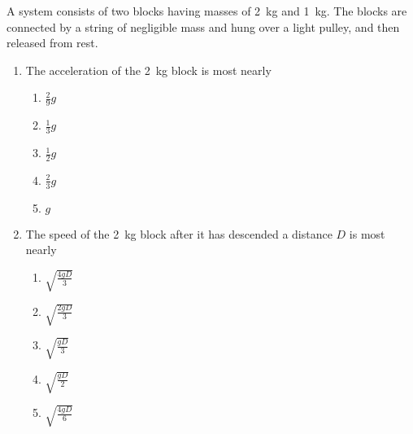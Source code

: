 \documentclass{../../../oss-apphys}
\begin{document}
\begin{multicols}{2}
  A system consists of two blocks having masses of \SI{2}{\kilo\gram} and
  \SI{1}{\kilo\gram}. The blocks are connected by a string of negligible mass
  and hung over a light pulley, and then released from rest.
  \begin{center}
  \end{center}
  \begin{enumerate}[resume,leftmargin=18pt]
  \item The acceleration of the \SI{2}{\kilo\gram} block is most nearly
    \begin{enumerate}[noitemsep,topsep=0pt,leftmargin=18pt,label=(\Alph*)]
    \item $\displaystyle\frac{2}{9}g$
    \item $\displaystyle\frac{1}{3}g$
    \item $\displaystyle\frac{1}{2}g$
    \item $\displaystyle\frac{2}{3}g$
    \item $g$
    \end{enumerate}
    \label{q:pulley1}
    
  \item The speed of the \SI{2}{\kilo\gram} block after it has descended a
    distance $D$ is most nearly
    \begin{enumerate}[noitemsep,topsep=0pt,leftmargin=18pt,label=(\Alph*)]
    \item $\displaystyle\sqrt{\frac{4gD}{3}}$
    \item $\displaystyle\sqrt{\frac{2gD}{3}}$
    \item $\displaystyle\sqrt{\frac{gD}{3}}$
    \item $\displaystyle\sqrt{\frac{gD}{2}}$
    \item $\displaystyle\sqrt{\frac{4gD}{6}}$
    \end{enumerate}
    \label{q:pulley2}
  \end{enumerate}
  \columnbreak
  

\end{multicols}
\end{document}
